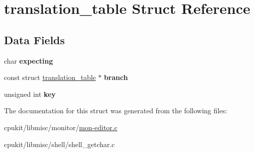 \hypertarget{structtranslation__table}{}\section{translation\+\_\+table Struct Reference}
\label{structtranslation__table}
\subsection*{Data Fields}
\begin{DoxyCompactItemize}
\item 
\mbox{\label{structtranslation__table_aedf423b3c635b654ef88ad207eb2c3e7}} 
char {\bfseries expecting}
\item 
\mbox{\label{structtranslation__table_a86ead9a8abd52a43b163609e5d40fb4f}} 
const struct \mbox{\hyperlink{structtranslation__table}{translation\+\_\+table}} $\ast$ {\bfseries branch}
\item 
\mbox{\label{structtranslation__table_a48b52385bf2b2f5ccf6700ff89adfed0}} 
unsigned int {\bfseries key}
\end{DoxyCompactItemize}


The documentation for this struct was generated from the following files\+:\begin{DoxyCompactItemize}
\item 
cpukit/libmisc/monitor/\mbox{\hyperlink{mon-editor_8c}{mon-\/editor.\+c}}\item 
cpukit/libmisc/shell/shell\+\_\+getchar.\+c\end{DoxyCompactItemize}
